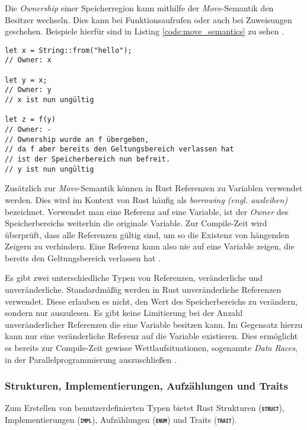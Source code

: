 Die \textit{Ownership} einer Speicherregion kann mithilfe der \textit{Move}-Semantik den Besitzer wechseln.
Dies kann bei Funktionsaufrufen oder auch bei Zuweisungen geschehen. Beispiele hierfür sind in Listing
\ref{code:move_semantics} zu sehen \cite{rustBook}.

\begin{lstlisting}[float,caption={Beispieldarstellung der \textit{Move}-Semantik},label=code:move_semantics]
let x = String::from("hello");
// Owner: x

let y = x;
// Owner: y
// x ist nun ungültig

let z = f(y) 
// Owner: -
// Ownership wurde an f übergeben,
// da f aber bereits den Geltungsbereich verlassen hat
// ist der Speicherbereich nun befreit.
// y ist nun ungültig
\end{lstlisting}

Zusätzlich zur \textit{Move}-Semantik können in Rust Referenzen zu Variablen verwendet werden. Dies wird im Kontext
von Rust häufig als \textit{borrowing (engl. ausleihen)} bezeichnet. Verwendet man eine Referenz auf eine Variable,
ist der \textit{Owner} des Speicherbereichs weiterhin die originale Variable.
Zur Compile-Zeit wird überprüft, dass alle Referenzen gültig sind, um so die Existenz von hängenden Zeigern
zu verhindern. Eine Referenz kann also nie auf eine Variable zeigen, die bereits den Geltungsbereich verlassen hat
\cite{rustBook}.

Es gibt zwei unterschiedliche
Typen von Referenzen, veränderliche und unveränderliche. Standardmäßig werden in Rust unveränderliche
Referenzen verwendet. Diese erlauben es nicht, den Wert des Speicherbereichs zu verändern, sondern nur auszulesen.
Es gibt keine Limitierung bei der Anzahl unveränderlicher Referenzen die eine Variable besitzen kann. Im Gegensatz
hierzu kann nur eine veränderliche Referenz auf die Variable existieren. Dies ermöglicht es bereits zur
Compile-Zeit gewisse Wettlaufsituationen, sogenannte \textit{Data Races},
in der Parallelprogrammierung auszuschließen \cite{rustBook}.

\subsubsection{Strukturen, Implementierungen, Aufzählungen und Traits}

Zum Erstellen von benutzerdefinierten Typen bietet Rust Strukturen (\texttt{\textsc{\textbf{struct}}}),
Implementierungen (\texttt{\textsc{\textbf{impl}}}), Aufzählungen (\texttt{\textsc{\textbf{enum}}}) und
Traits (\texttt{\textsc{\textbf{trait}}}).

